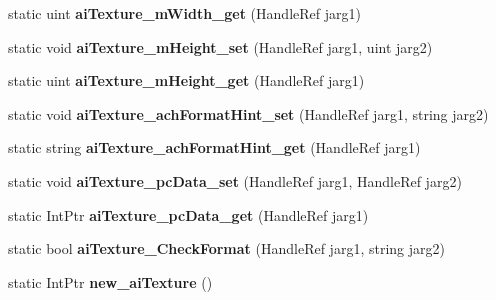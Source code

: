 \begin{DoxyCompactItemize}
\item 
\hypertarget{class_assimp_p_i_n_v_o_k_e_a91c6a0b2b10fba3ce77af219f8a98a61}{static uint {\bfseries ai\+Texture\+\_\+m\+Width\+\_\+get} (Handle\+Ref jarg1)}\label{class_assimp_p_i_n_v_o_k_e_a91c6a0b2b10fba3ce77af219f8a98a61}

\item 
\hypertarget{class_assimp_p_i_n_v_o_k_e_aebd5771759a134b8bb2680b53bef7a0d}{static void {\bfseries ai\+Texture\+\_\+m\+Height\+\_\+set} (Handle\+Ref jarg1, uint jarg2)}\label{class_assimp_p_i_n_v_o_k_e_aebd5771759a134b8bb2680b53bef7a0d}

\item 
\hypertarget{class_assimp_p_i_n_v_o_k_e_a3d14d5311732735ec0704019cfafc65e}{static uint {\bfseries ai\+Texture\+\_\+m\+Height\+\_\+get} (Handle\+Ref jarg1)}\label{class_assimp_p_i_n_v_o_k_e_a3d14d5311732735ec0704019cfafc65e}

\item 
\hypertarget{class_assimp_p_i_n_v_o_k_e_ac48830876e6c576708fbdb38d32d50fe}{static void {\bfseries ai\+Texture\+\_\+ach\+Format\+Hint\+\_\+set} (Handle\+Ref jarg1, string jarg2)}\label{class_assimp_p_i_n_v_o_k_e_ac48830876e6c576708fbdb38d32d50fe}

\item 
\hypertarget{class_assimp_p_i_n_v_o_k_e_aad5a5ebefe10b0a81247e2301904296b}{static string {\bfseries ai\+Texture\+\_\+ach\+Format\+Hint\+\_\+get} (Handle\+Ref jarg1)}\label{class_assimp_p_i_n_v_o_k_e_aad5a5ebefe10b0a81247e2301904296b}

\item 
\hypertarget{class_assimp_p_i_n_v_o_k_e_ad9df213857b1dbcf76551ed4701d13c8}{static void {\bfseries ai\+Texture\+\_\+pc\+Data\+\_\+set} (Handle\+Ref jarg1, Handle\+Ref jarg2)}\label{class_assimp_p_i_n_v_o_k_e_ad9df213857b1dbcf76551ed4701d13c8}

\item 
\hypertarget{class_assimp_p_i_n_v_o_k_e_a00ddd019ecc3f633dab3c3c82135ce96}{static Int\+Ptr {\bfseries ai\+Texture\+\_\+pc\+Data\+\_\+get} (Handle\+Ref jarg1)}\label{class_assimp_p_i_n_v_o_k_e_a00ddd019ecc3f633dab3c3c82135ce96}

\item 
\hypertarget{class_assimp_p_i_n_v_o_k_e_a550c9202fc3951511747ab4e07e658c4}{static bool {\bfseries ai\+Texture\+\_\+\+Check\+Format} (Handle\+Ref jarg1, string jarg2)}\label{class_assimp_p_i_n_v_o_k_e_a550c9202fc3951511747ab4e07e658c4}

\item 
\hypertarget{class_assimp_p_i_n_v_o_k_e_a254296dbea098b8b6ced970e8b34691c}{static Int\+Ptr {\bfseries new\+\_\+ai\+Texture} ()}\label{class_assimp_p_i_n_v_o_k_e_a254296dbea098b8b6ced970e8b34691c}


\end{DoxyCompactItemize}
